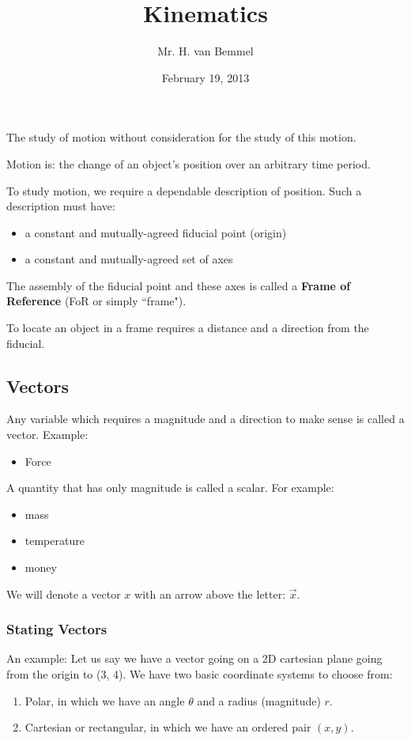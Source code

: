 \documentclass{article}
\begin{document}
\title{Kinematics}
\author{Mr. H. van Bemmel}
\date{February 19, 2013}
\maketitle

The study of motion without consideration for the study of this motion.

Motion is: the change of an object's position over an arbitrary time period.

To study motion, we require a dependable description of position.
Such a description must have:
\begin{itemize}
    \item a constant and mutually-agreed fiducial point (origin)
    \item a constant and mutually-agreed set of axes
\end{itemize}
The assembly of the fiducial point and these axes is called a {\bf Frame of Reference} (FoR or simply ``frame").

To locate an object in a frame requires a distance and a direction from the fiducial.

\subsection{Vectors}
Any variable which requires a magnitude and a direction to make sense is called a vector.
Example:
\begin {itemize}
    \item Force
\end{itemize}

A quantity that has only magnitude is called a scalar. For example: 
\begin{itemize}
    \item mass
    \item temperature
    \item money
\end{itemize}

We will denote a vector $x$ with an arrow above the letter: $\vec{x}$.

\subsubsection{Stating Vectors}
An example:
    Let us say we have a vector going on a 2D cartesian plane going from the origin
    to (3, 4). We have two basic coordinate systems to choose from:
    \begin{enumerate}
        \item Polar, in which we have an angle $\theta$ and a radius (magnitude) $r$.
        \item Cartesian or rectangular, in which we have an ordered pair $(x, y)$.
    \end{enumerate}
    
\end{document}
